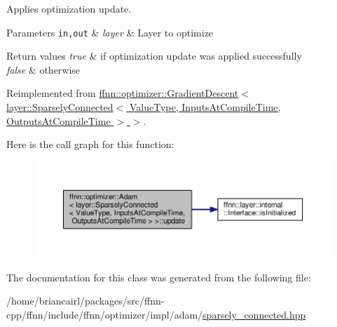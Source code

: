 Applies optimization update. 


\begin{DoxyParams}[1]{Parameters}
\mbox{\tt in,out}  & {\em layer} & Layer to optimize \\
\hline
\end{DoxyParams}

\begin{DoxyRetVals}{Return values}
{\em true} & if optimization update was applied successfully \\
\hline
{\em false} & otherwise \\
\hline
\end{DoxyRetVals}


Reimplemented from \hyperlink{classffnn_1_1optimizer_1_1_gradient_descent_3_01layer_1_1_sparsely_connected_3_01_value_type_00_e6c27913ab0d90f52f73031aa88c19bf_ada280929e93a2d12f0bc21e9077e75a1}{ffnn\-::optimizer\-::\-Gradient\-Descent$<$ layer\-::\-Sparsely\-Connected$<$ Value\-Type, Inputs\-At\-Compile\-Time, Outputs\-At\-Compile\-Time $>$ $>$}.



Here is the call graph for this function\-:\nopagebreak
\begin{figure}[H]
\begin{center}
\leavevmode
\includegraphics[width=350pt]{classffnn_1_1optimizer_1_1_adam_3_01layer_1_1_sparsely_connected_3_01_value_type_00_01_inputs_at5101e46d32858ec2169acdeede08d723_aaa3b2eb55a9d80d51330c132df65214b_cgraph}
\end{center}
\end{figure}




The documentation for this class was generated from the following file\-:\begin{DoxyCompactItemize}
\item 
/home/briancairl/packages/src/ffnn-\/cpp/ffnn/include/ffnn/optimizer/impl/adam/\hyperlink{optimizer_2impl_2adam_2sparsely__connected_8hpp}{sparsely\-\_\-connected.\-hpp}\end{DoxyCompactItemize}
